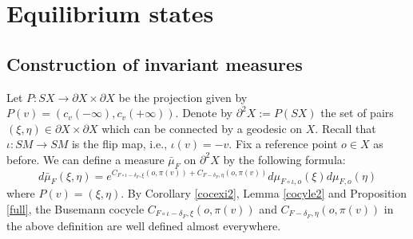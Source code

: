 \documentclass[11pt]{amsart}
\theoremstyle{definition}
\def\p{{\partial}}
\def\pX{{\partial X}}
\def\d{\delta}   %
\begin{document}
\section{Equilibrium states}

\subsection{Construction of invariant measures}
Let $P:SX \rightarrow \pX \times \pX$ be the projection given by $P(v)=(c_{v}(-\infty),c_{v}(+\infty))$. Denote by $\p^2X:=P(SX)$ the set of pairs $(\xi,\eta)\in \pX\times \pX$ which can be connected by a geodesic on $X$. Recall that $\iota: SM\to SM$ is the flip map, i.e., $\iota(v)=-v$.
Fix a reference point $o\in X$ as before. We can define a measure $\bar{\mu}_{F}$
on $\p^2X$ by the following formula:
$$d \bar \mu_{F}(\xi,\eta) = e^{C_{F\circ \iota-\d_F,\xi}(o, \pi(v))+C_{F-\d_F,\eta}(o, \pi(v))}d\mu_{F\circ \iota,o}(\xi) d\mu_{F,o}(\eta)$$
where $P(v)=(\xi,\eta)$. By Corollary \ref{cocexi2}, Lemma \ref{cocyle2} and Proposition \ref{full}, the Busemann cocycle $C_{F\circ \iota-\d_F,\xi}(o, \pi(v))$ and $C_{F-\d_F,\eta}(o, \pi(v))$ in the above definition are well defined almost everywhere.
\end{document}
